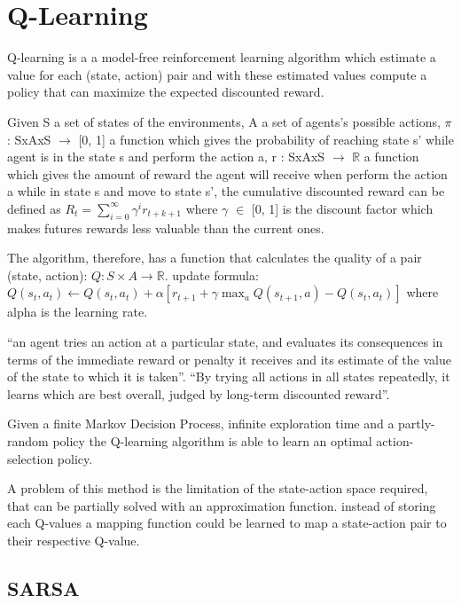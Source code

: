 \section{Q-Learning}

Q-learning\cite{watkins1992q} is a a model-free reinforcement learning algorithm which estimate a value for each (state, action) pair
and with these estimated values compute a policy that can maximize the expected discounted reward.

Given S a set of states of the environments, A a set of agents's possible actions,
$\pi$ : SxAxS $\rightarrow$ [0, 1] a function which gives the probability of reaching state s' while agent is in the state s and perform the action a,
r : SxAxS $\rightarrow$ $\mathbb{R}$ a function which gives the amount of reward the agent will receive when perform the action a while in state s and move to state s',
the cumulative discounted reward can be defined as $R_t = \sum_{i=0}^{\infty} \gamma^i r_{t+k+1}$
where $\gamma$ $\in$ [0, 1] is the discount factor which makes futures rewards less valuable than the current ones.

The algorithm, therefore, has a function that calculates the quality of a pair (state, action): $Q:S\times A\to {\mathbb  {R}}.$
update formula: $Q(s_t, a_t) \leftarrow Q(s_t, a_t) + \alpha [r_{t+1} + \gamma \max_a Q(s_{t+1}, a) - Q(s_t, a_t)]$ where alpha is the learning rate.

``an agent tries an action at a particular state, and evaluates its consequences in terms of the immediate reward or penalty
it receives and its estimate of the value of the state to which it is taken''\cite{watkins1992q}.
``By trying all actions in all states repeatedly, it learns which are best overall, judged by long-term discounted reward''\cite{watkins1992q}.

Given a finite Markov Decision Process, infinite exploration time and a partly-random policy
the Q-learning algorithm is able to learn an optimal action-selection policy.

A problem of this method is the limitation of the state-action space required, that can be partially solved with an approximation function.
instead of storing each Q-values a mapping function could be learned to map a state-action pair to their respective Q-value.

\subsection{SARSA}

